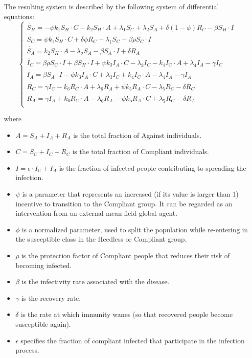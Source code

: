 The resulting system is described by the following system of differential equations: 
\begin{equation}
	\begin{cases}
		\dot{S_H} = - \psi k_1 S_H \cdot C - k_2 S_H \cdot A + \lambda_1 S_C + \lambda_2 S_A + \delta(1-\phi)R_C - \beta S_H \cdot I\\
		\dot{S_C} = \psi k_1 S_H \cdot C + \delta \phi R_C - \lambda_1 S_C - \beta \rho S_C \cdot I  \\
		\dot{S_A} = k_2 S_H \cdot A - \lambda_2 S_A - \beta S_A \cdot I + \delta R_A \\
		\dot{I_C} = \beta \rho S_C \cdot I + \beta S_H \cdot I + \psi k_3 I_A \cdot C - \lambda_3 I_C -  k_4 I_C \cdot A + \lambda_4 I_A - \gamma I_C\\
		 \dot{I_A} = \beta S_A \cdot I - \psi k_3 I_A \cdot C + \lambda_3 I_C + k_4 I_C \cdot A - \lambda_4 I_A - \gamma I_A\\
		 \dot{R_C} = \gamma I_C - k_6 R_C \cdot A + \lambda_6 R_A + \psi k_5 R_A \cdot C - \lambda_5 R_C - \delta R_C\\
		 \dot{R_A} = \gamma I_A + k_6 R_C \cdot A - \lambda_6 R_A - \psi k_5 R_A \cdot C + \lambda_5 R_C - \delta R_A\\
	\end{cases}
	\label{eq:epi_behavioural_eq}
\end{equation}

where
\begin{itemize}
	\item $A = S_A + I_A + R_A$ is the total fraction of Against individuals.
	\item $C = S_C + I_C + R_C$  is the total fraction of Compliant individuals.
	\item $I = \epsilon \cdot I_C + I_A$ is the fraction of infected people contributing to spreading the infection.
	\item $\psi$ is a parameter that represents an increased (if its value is larger than 1) incentive to transition to the Compliant group. It can be regarded as an intervention from an external mean-field global agent.
	\item $\phi$ is a normalized parameter, used to split the population while re-entering in the susceptible class in the Heedless or Compliant group. 
	\item $\rho$ is the protection factor of Compliant people that reduces their risk of becoming infected.
	\item $\beta$ is the infectivity rate associated with the disease.
	\item $\gamma$ is the recovery rate.
	\item $\delta$ is the rate at which immunity wanes (so that recovered people become susceptible again).
	\item $\epsilon$ specifies the fraction of compliant infected that participate in the infection process.
\end{itemize}

